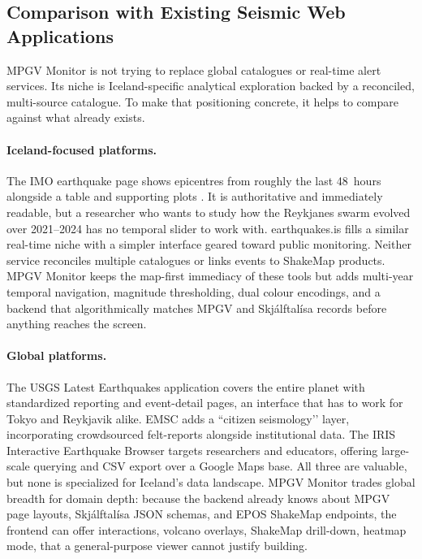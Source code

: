 \documentclass[12pt]{article}
\begin{document}
\subsection{Comparison with Existing Seismic Web Applications}
\label{subsec:frontend_comparison}

MPGV Monitor is not trying to replace global catalogues or real-time alert services. Its niche is Iceland-specific analytical exploration backed by a reconciled, multi-source catalogue. To make that positioning concrete, it helps to compare against what already exists.

\paragraph{Iceland-focused platforms.}
The IMO earthquake page shows epicentres from roughly the last 48~hours alongside a table and supporting plots \cite{imo_quakes_48h}. It is authoritative and immediately readable, but a researcher who wants to study how the Reykjanes swarm evolved over 2021--2024 has no temporal slider to work with. earthquakes.is \cite{earthquakes_is} fills a similar real-time niche with a simpler interface geared toward public monitoring. Neither service reconciles multiple catalogues or links events to ShakeMap products. MPGV Monitor keeps the map-first immediacy of these tools but adds multi-year temporal navigation, magnitude thresholding, dual colour encodings, and a backend that algorithmically matches MPGV and Skjálftalísa records before anything reaches the screen.

\paragraph{Global platforms.}
The USGS Latest Earthquakes application \cite{usgs_latest_map} covers the entire planet with standardized reporting and event-detail pages, an interface that has to work for Tokyo and Reykjavik alike. EMSC \cite{emsc_home,emsc_map} adds a ``citizen seismology’’ layer, incorporating crowdsourced felt-reports alongside institutional data. The IRIS Interactive Earthquake Browser \cite{iris_ieb_app,iris_ieb_help} targets researchers and educators, offering large-scale querying and CSV export over a Google Maps base. All three are valuable, but none is specialized for Iceland’s data landscape. MPGV Monitor trades global breadth for domain depth: because the backend already knows about MPGV page layouts, Skjálftalísa JSON schemas, and EPOS ShakeMap endpoints, the frontend can offer interactions, volcano overlays, ShakeMap drill-down, heatmap mode, that a general-purpose viewer cannot justify building.
\end{document}
